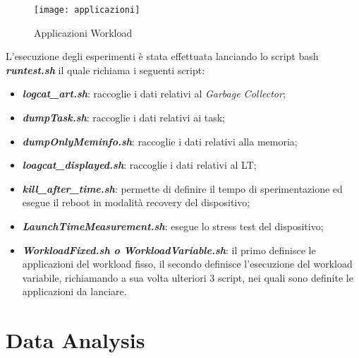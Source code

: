 \begin{figure}[!htbp]
  \centering
  \texttt{[image: applicazioni]}
  \caption{Applicazioni Workload}
  \label{and_applicazioni}
\end{figure}

L'esecuzione degli esperimenti è stata effettuata lanciando lo script bash
\textit{\textbf{runtest.sh}} il quale richiama i seguenti script:
  \begin{itemize}
    \item \textit{\textbf{logcat\_art.sh}}: raccoglie i dati relativi al \textit{Garbage Collector};
    \item \textit{\textbf{dumpTask.sh}}: raccoglie i dati relativi ai task;
    \item \textit{\textbf{dumpOnlyMeminfo.sh}}: raccoglie i dati relativi alla memoria;
    \item \textit{\textbf{loagcat\_displayed.sh}}: raccoglie i dati relativi al LT;
    \item \textit{\textbf{kill\_after\_time.sh}}: permette di definire il tempo di
    sperimentazione ed esegue il reboot in modalità recovery del dispositivo;
    \item \textit{\textbf{LaunchTimeMeasurement.sh}}: esegue lo stress test del dispositivo;
    \item \textit{\textbf{WorkloadFixed.sh o WorkloadVariable.sh}}: il primo definisce le applicazioni del
    workload fisso, il secondo definisce l'esecuzione del workload variabile, richiamando
    a sua volta ulteriori 3 script, nei quali sono definite le applicazioni da lanciare.
  \end{itemize}

\section{Data Analysis}

